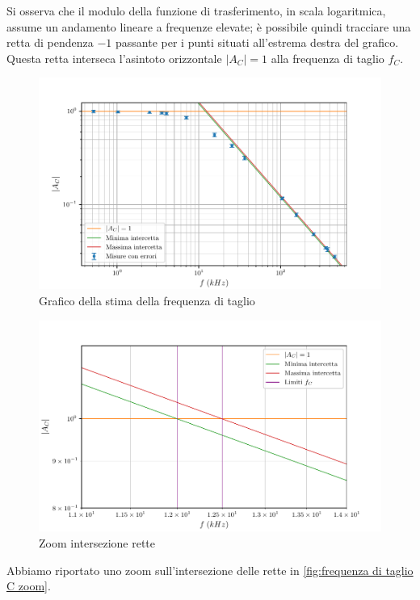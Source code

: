 \documentclass[11pt, a4paper]{article}
\numberwithin{equation}{section} %
\begin{document}
\newpage

Si osserva che il modulo della funzione di trasferimento, in scala logaritmica, assume un andamento lineare a frequenze elevate; è possibile quindi tracciare una retta di pendenza $-1$ passante per i punti situati all'estrema destra del grafico. Questa retta interseca l'asintoto orizzontale $|A_{C}| = 1$ alla frequenza di taglio $f_{C}$.

\begin{figure}[ht!]
    \includegraphics{onda_sin_AC(f)_taglio.pdf}
    \caption{Grafico della stima della frequenza di taglio}
    \label{fig:frequenza di taglio C}
\end{figure}

\begin{figure}[ht!]
    \includegraphics{onda_sin_AC(f)_taglio_frequenza.pdf}
    \caption{Zoom intersezione rette}
    \label{fig:frequenza di taglio C zoom}
\end{figure}

Abbiamo riportato uno zoom sull'intersezione delle rette in \autoref{fig:frequenza di taglio C zoom}.
\end{document}
